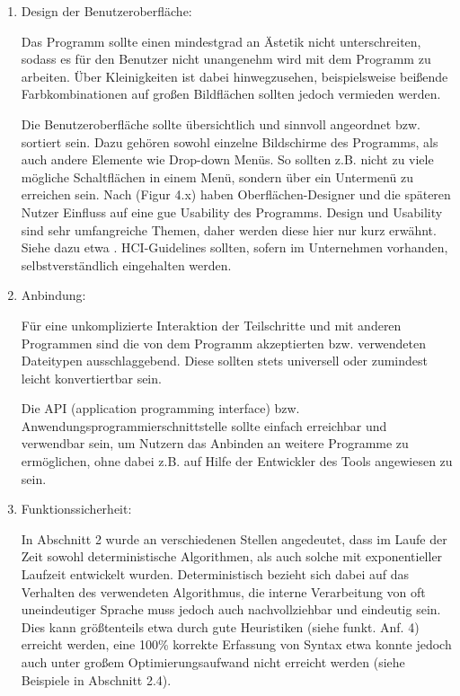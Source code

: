 \documentclass[12pt]{report}
\begin{document}
\begin{enumerate}
\item Design der Benutzeroberfläche:

Das Programm sollte einen mindestgrad an Ästetik nicht unterschreiten, sodass es für den Benutzer nicht unangenehm wird mit dem Programm zu arbeiten. Über Kleinigkeiten ist dabei hinwegzusehen, beispielsweise \glqq  beißende\grqq{} Farbkombinationen auf großen Bildflächen sollten jedoch vermieden werden. 

Die Benutzeroberfläche sollte übersichtlich und sinnvoll angeordnet bzw. sortiert sein. Dazu gehören sowohl einzelne Bildschirme des Programms, als auch andere Elemente wie Drop-down Menüs. So sollten z.B. nicht zu viele mögliche Schaltflächen in einem Menü, sondern über ein Untermenü zu erreichen sein. Nach \cite{hl13} (Figur 4.x) haben Oberflächen-Designer und die späteren Nutzer Einfluss auf eine gue Usability des Programms. Design und Usability sind sehr umfangreiche Themen, daher werden diese hier nur kurz erwähnt. Siehe dazu etwa \cite{shn10}. HCI-Guidelines sollten, sofern im Unternehmen vorhanden, selbstverständlich eingehalten werden.

\item Anbindung:

Für eine unkomplizierte Interaktion der Teilschritte und mit anderen Programmen sind die von dem Programm akzeptierten bzw. verwendeten Dateitypen ausschlaggebend. Diese sollten stets universell oder zumindest leicht konvertiertbar sein. 

Die API (application programming interface) bzw. Anwendungsprogrammierschnittstelle sollte einfach erreichbar und verwendbar sein, um Nutzern das Anbinden an weitere Programme zu ermöglichen, ohne dabei z.B. auf Hilfe der Entwickler des Tools angewiesen zu sein. 
 
\item Funktionssicherheit:

In Abschnitt 2 wurde an verschiedenen Stellen angedeutet, dass im Laufe der Zeit sowohl deterministische Algorithmen, als auch solche mit exponentieller Laufzeit entwickelt wurden. Deterministisch bezieht sich dabei auf das Verhalten des verwendeten Algorithmus, die interne Verarbeitung von oft uneindeutiger Sprache muss jedoch auch nachvollziehbar und eindeutig sein. Dies kann größtenteils etwa durch gute Heuristiken (siehe funkt. Anf. 4) erreicht werden, eine 100\% korrekte Erfassung von Syntax etwa konnte jedoch auch unter großem Optimierungsaufwand nicht erreicht werden (siehe Beispiele in Abschnitt 2.4). 


\end{enumerate}
\end{document}

